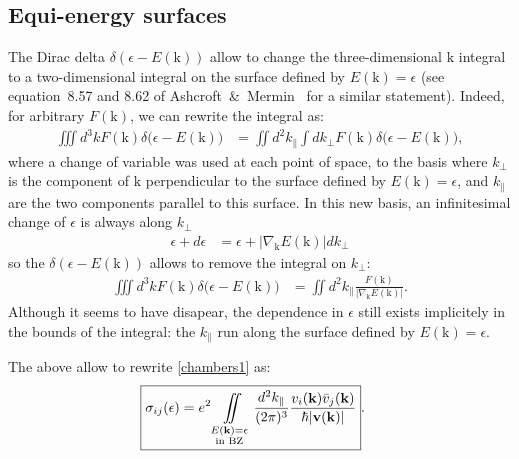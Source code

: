 \documentclass[notitlepage,11pt,nofootinbib]{revtex4-1}
\renewcommand{\vec}[1]{\bm{\mathrm{#1}}}
\begin{document}
\subsection{Equi-energy surfaces}\label{sec_surfaces}
The Dirac delta $\delta(\epsilon-E(\vec k))$ allow to change the three-dimensional $\vec k$ integral to a two-dimensional integral on the surface defined by $E(\vec k)=\epsilon$ (see equation~8.57 and 8.62 of Ashcroft~\&~Mermin~\cite{ashcroft_solid_1976} for a similar statement).
Indeed, for arbitrary $F(\vec k)$, we can rewrite the integral as:
\begin{align}
\iiint d^3 k 
F(\vec k)\delta\big(\epsilon - E(\vec k)\big)
&=
\iint d^2k_{\parallel}
\int dk_{\perp}
F(\vec k)\delta\big(\epsilon - E(\vec k)\big),
\end{align}
where a change of variable was used at each point of space, to the basis where $k_{\perp}$ is the component of $\vec k$ perpendicular to the surface defined by $E(\vec k)=\epsilon$, and $k_{\parallel}$ are the two components parallel to this surface. In this new basis, an infinitesimal change of $\epsilon$ is always along $k_{\perp}$
\begin{align}
\epsilon + d\epsilon &= \epsilon + |\nabla_{\vec k}E(\vec k)|dk_{\perp}
\end{align}
so the $\delta(\epsilon - E(\vec k))$ allows to remove the integral on $k_{\perp}$: 
\begin{align}
\iiint d^3 k 
F(\vec k)\delta\big(\epsilon - E(\vec k)\big)
&=
\iint d^2k_{\parallel} 
\frac{F(\vec k)}{|\nabla_{\vec k}E(\vec k)|}.
\end{align}
Although it seems to have disapear, the dependence in $\epsilon$ still exists implicitely in the bounds of the integral: the $k_{\parallel}$ run along the surface defined by $E(\vec k)=\epsilon$.

The above allow to rewrite \eqref{chambers1} as:
\begin{align}
\Aboxed{
\sigma_{ij}(\epsilon) 
&=
e^2
\iint\limits_{\substack{E(\vec k)=\epsilon\\ \text{in BZ}}}
\frac{d^2k_{\parallel}}{(2\pi)^3}
\frac{v_{i}(\vec k)\bar{v}_{j}(\vec k)}{\hbar|\vec v(\vec k)|}
}.
\label{chambersSurfaces}
\end{align}
\end{document}
